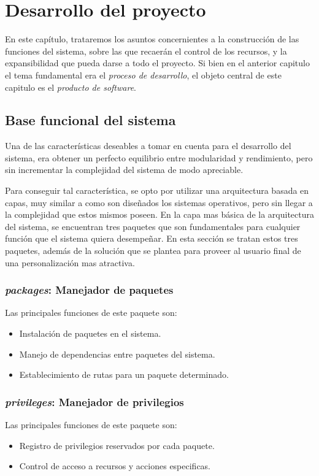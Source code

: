 \chapter{Desarrollo del proyecto}

En este capítulo, trataremos los asuntos concernientes a la construcción de las
funciones del sistema, sobre las que recaerán el control de los recursos, y la
expansibilidad que pueda darse a todo el proyecto. Si bien en el anterior
capitulo el tema fundamental era el \emph{proceso de desarrollo}, el objeto
central de este capitulo es el \emph{producto de software}.

\section{Base funcional del sistema}
Una de las características deseables a tomar en cuenta para el desarrollo del
sistema, era obtener un perfecto equilibrio entre modularidad y rendimiento,
pero sin incrementar la complejidad del sistema de modo apreciable.

Para conseguir tal característica, se opto por utilizar una arquitectura basada
en capas, muy similar a como son diseñados los sistemas operativos, pero sin
llegar a la complejidad que estos mismos poseen. En la capa mas básica de la
arquitectura del sistema, se encuentran tres paquetes que son fundamentales para
cualquier función que el sistema quiera desempeñar. En esta sección se tratan
estos tres paquetes, además de la solución que se plantea para proveer al
usuario final de una personalización mas atractiva.

\subsection{\emph{packages}: Manejador de paquetes}
Las principales funciones de este paquete son:
\begin{itemize}
\item Instalación de paquetes en el sistema.
\item Manejo de dependencias entre paquetes del sistema.
\item Establecimiento de rutas para un paquete determinado.
\end{itemize}

\subsection{\emph{privileges}: Manejador de privilegios}
Las principales funciones de este paquete son:
\begin{itemize}
\item Registro de privilegios reservados por cada paquete.
\item Control de acceso a recursos y acciones especificas.
\end{itemize}

